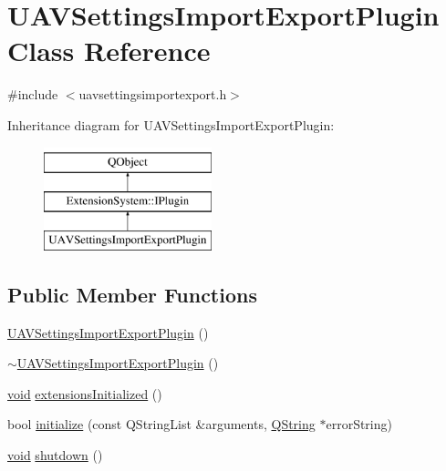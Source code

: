 \hypertarget{class_u_a_v_settings_import_export_plugin}{\section{U\-A\-V\-Settings\-Import\-Export\-Plugin Class Reference}
\label{class_u_a_v_settings_import_export_plugin}
}


{\ttfamily \#include $<$uavsettingsimportexport.\-h$>$}

Inheritance diagram for U\-A\-V\-Settings\-Import\-Export\-Plugin\-:\begin{figure}[H]
\begin{center}
\leavevmode
\includegraphics[height=3.000000cm]{class_u_a_v_settings_import_export_plugin}
\end{center}
\end{figure}
\subsection*{Public Member Functions}
\begin{DoxyCompactItemize}
\item 
\hyperlink{group___u_a_v_settings_import_export_gad19bf02649bc86e8245c1ad401db02b7}{U\-A\-V\-Settings\-Import\-Export\-Plugin} ()
\item 
\hyperlink{group___u_a_v_settings_import_export_ga14bcad14e65bb435b384bc26e367f553}{$\sim$\-U\-A\-V\-Settings\-Import\-Export\-Plugin} ()
\item 
\hyperlink{group___u_a_v_objects_plugin_ga444cf2ff3f0ecbe028adce838d373f5c}{void} \hyperlink{group___u_a_v_settings_import_export_ga8cbd9cce7f1b58c44d6dfdef36b50f81}{extensions\-Initialized} ()
\item 
bool \hyperlink{group___u_a_v_settings_import_export_ga78fbb80d8d70b2e76652a80594215faf}{initialize} (const Q\-String\-List \&arguments, \hyperlink{group___u_a_v_objects_plugin_gab9d252f49c333c94a72f97ce3105a32d}{Q\-String} $\ast$error\-String)
\item 
\hyperlink{group___u_a_v_objects_plugin_ga444cf2ff3f0ecbe028adce838d373f5c}{void} \hyperlink{group___u_a_v_settings_import_export_ga5e2dd335427148df64c9b2b3b9a16e8d}{shutdown} ()
\end{DoxyCompactItemize}


